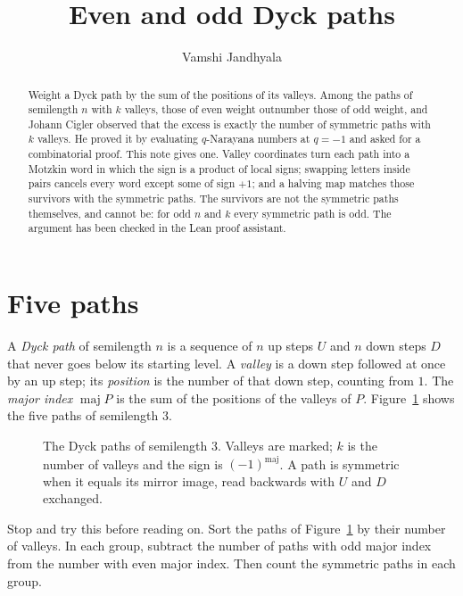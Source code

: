 \documentclass[11pt]{article}
\title{Even and odd Dyck paths}
\author{Vamshi Jandhyala}
\date{}
\theoremstyle{remark}
\newcommand{\maj}{\operatorname{maj}}
\begin{document}
\maketitle
\vspace{-2em}

\begin{abstract}
Weight a Dyck path by the sum of the positions of its valleys. Among the paths of semilength
$n$ with $k$ valleys, those of even weight outnumber those of odd weight, and Johann Cigler
observed that the excess is exactly the number of symmetric paths with $k$ valleys. He proved
it by evaluating $q$-Narayana numbers at $q=-1$ and asked for a combinatorial proof. This note
gives one. Valley coordinates turn each path into a Motzkin word in which the sign is a product
of local signs; swapping letters inside pairs cancels every word except some of sign $+1$; and
a halving map matches those survivors with the symmetric paths. The survivors are not the
symmetric paths themselves, and cannot be: for odd $n$ and $k$ every symmetric path is odd. The
argument has been checked in the Lean proof assistant.
\end{abstract}

\section{Five paths}

A \emph{Dyck path} of semilength $n$ is a sequence of $n$ up steps $U$ and $n$ down steps
$D$ that never goes below its starting level. A \emph{valley} is a down step followed at once
by an up step; its \emph{position} is the number of that down step, counting from $1$. The
\emph{major index} $\maj P$ is the sum of the positions of the valleys of $P$. Figure~\ref{fig:three}
shows the five paths of semilength $3$.

\begin{figure}[ht]
\centering

\caption{The Dyck paths of semilength $3$. Valleys are marked; $k$ is the number of valleys and
the sign is $(-1)^{\maj}$. A path is symmetric when it equals its mirror image, read backwards
with $U$ and $D$ exchanged.}
\label{fig:three}
\end{figure}

Stop and try this before reading on. Sort the paths of Figure~\ref{fig:three} by their number
of valleys. In each group, subtract the number of paths with odd major index from the number
with even major index. Then count the symmetric paths in each group.
\end{document}
